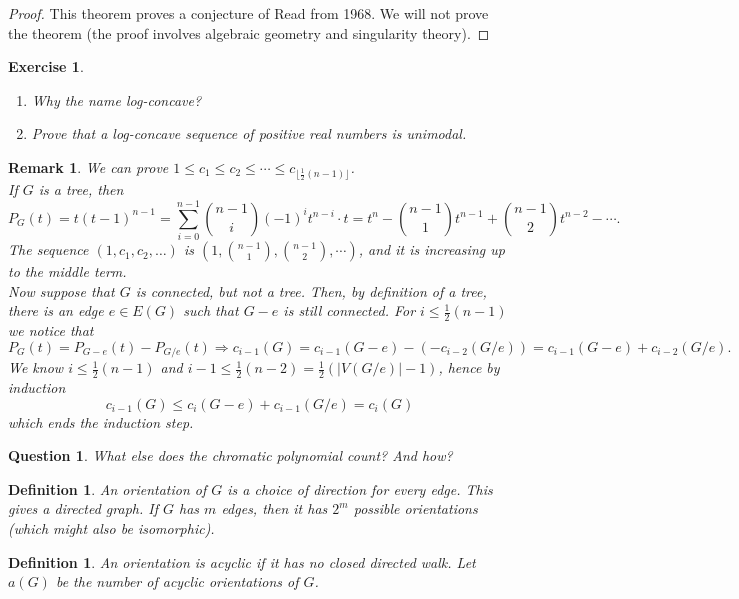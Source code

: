 \documentclass[a4paper]{article}
\theoremstyle{plain}
\newtheorem{definition}[lemma]{Definition}
\theoremstyle{myremark}
\newtheorem{remark}[lemma]{Remark}
\newtheorem{exercise}[lemma]{Exercise}
\newtheorem*{question}{Question}
\begin{document}
\begin{proof}
This theorem proves a conjecture of Read from 1968. We will not prove the theorem (the proof involves algebraic geometry and singularity theory).
\end{proof}

\begin{exercise}
\begin{enumerate}
\item Why the name \textit{log-concave}?
\item Prove that a log-concave sequence of positive real numbers is unimodal.
\end{enumerate}
\end{exercise}

\begin{remark} We can prove $1 \leqslant c_1 \leqslant c_2 \leqslant \cdots \leqslant c_{\lfloor \frac{1}{2}(n-1)\rfloor}$.
\\ If $G$ is a tree, then
$$P_G(t)=t(t-1)^{n-1}=\sum_{i=0}^{n-1} {n-1 \choose i}(-1)^it^{n-i}\cdot t=t^n-{n-1 \choose 1}t^{n-1}+{n-1 \choose 2}t^{n-2}-\cdots.$$
The sequence $(1,c_1,c_2,\dots)$ is $(1,{n-1 \choose 1},{n-1 \choose 2},\cdots)$, and it is increasing up to the middle term.
\\ Now suppose that $G$ is connected, but not a tree. Then, by definition of a tree, there is an edge $e\in E(G)$ such that $G-e$ is still connected. For $i\leqslant \frac{1}{2}(n-1)$ we notice that
$$P_G(t)=P_{G-e}(t)-P_{G/e}(t) \Longrightarrow c_{i-1}(G)=c_{i-1}(G-e)-(-c_{i-2}(G/e))=c_{i-1}(G-e)+c_{i-2}(G/e).$$
We know $i\leqslant \frac{1}{2}(n-1)$ and $i-1 \leqslant \frac{1}{2}(n-2)=\frac{1}{2}(|V(G/e)|-1)$, hence by induction 
 $$c_{i-1}(G)\leqslant c_i(G-e)+c_{i-1}(G/e)=c_i(G)$$
which ends the induction step.
\end{remark}


\begin{question} What else does the chromatic polynomial count? And how?
\end{question}

\begin{definition} An \emph{orientation} of $G$ is a choice  of direction for every edge. This gives a directed graph. If $G$ has $m$ edges, then it has $2^m$ possible orientations (which might also be isomorphic).
\end{definition}

\begin{definition} An orientation is \emph{acyclic} if it has no closed directed walk. Let $a(G)$ be the number of acyclic orientations of $G$.
\end{definition}
\end{document}
